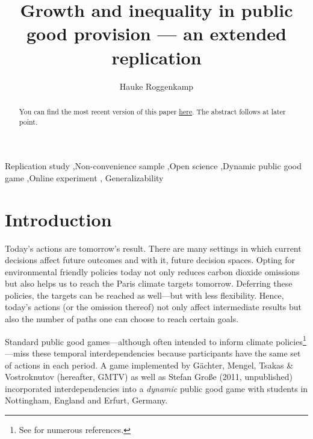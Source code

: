 \documentclass[
  authoryear,
  preprint,
  3p]{elsarticle}
\begin{document}
\begin{frontmatter}
\title{Growth and inequality in public good provision --- an extended
replication}
\author[1,2]{Hauke Roggenkamp%
%
}



        
\begin{abstract}
You can find the most recent version of this paper
\href{https://github.com/Howquez/coopUncertainty/blob/main/analysis/quarto/paper.pdf}{here}.
The abstract follows at later point.
\end{abstract}





\begin{keyword}
    Replication study \sep Non-convenience sample \sep Open
science \sep Dynamic public good game \sep Online experiment \sep 
    Generalizability
\end{keyword}
\end{frontmatter}\ifdefined\Shaded\renewenvironment{Shaded}{\begin{tcolorbox}[interior hidden, sharp corners, frame hidden, boxrule=0pt, breakable, enhanced, borderline west={3pt}{0pt}{shadecolor}]}{\end{tcolorbox}}\fi

\hypertarget{sec-intro}{%
\section{Introduction}\label{sec-intro}}

Today's actions are tomorrow's result. There are many settings in which
current decisions affect future outcomes and with it, future decision
spaces. Opting for environmental friendly policies today not only
reduces carbon dioxide omissions but also helps us to reach the Paris
climate targets tomorrow. Deferring these policies, the targets can be
reached as well---but with less flexibility. Hence, today's actions (or
the omission thereof) not only affect intermediate results but also the
number of paths one can choose to reach certain goals.

Standard public good games---although often intended to inform climate
policies\footnote{See \citet[p.~1]{GKLS2020} for numerous references.}---miss
these temporal interdependencies because participants have the same set
of actions in each period. A game implemented by Gächter, Mengel, Tsakas
\& Vostroknutov \citeyearpar{GMTV2017} (hereafter, GMTV) as well as
Stefan Große (2011, unpublished) incorporated interdependencies into a
\emph{dynamic} public good game with students in Nottingham, England and
Erfurt, Germany.
\end{document}
